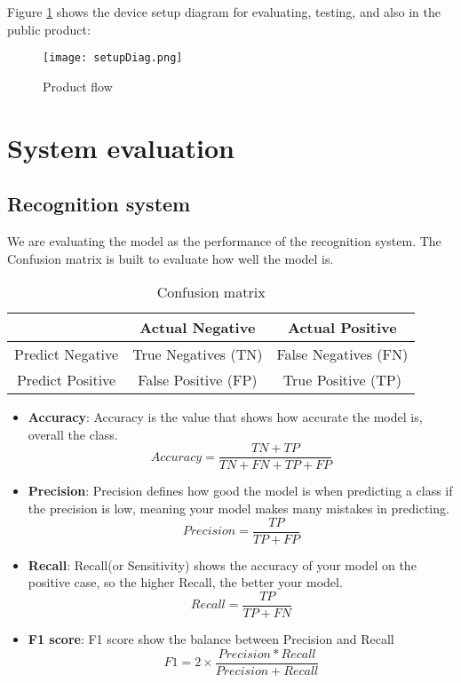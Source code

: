 Figure \ref{fig:prodSetup} shows the device setup diagram for evaluating, testing, and also in the public product:

\begin{figure}[H]
    \centering
    \texttt{[image: setupDiag.png]}
    \caption{Product flow}
    \label{fig:prodSetup}
\end{figure}

\section{System evaluation}
\subsection{Recognition system}
We are evaluating the model as the performance of the recognition system. The Confusion matrix is built to evaluate how well the model is.

\begin{table}[H]
    \centering
    \caption{Confusion matrix}
    \begin{tabular}{|c|c|c|}
        \hline
         &  Actual Negative &  Actual Positive\\
        \hline
        Predict Negative & True Negatives (TN) & False Negatives (FN)\\
        \hline
        Predict Positive & False Positive (FP) & True Positive (TP)\\
        \hline
    \end{tabular}
    \label{tab:confusionMatrix}
\end{table}
\begin{itemize}
    \item \textbf{Accuracy}: Accuracy is the value that shows how accurate  the model is, overall the class.
    \[
        Accuracy = \frac{TN+TP}{TN+FN+TP+FP}
    \]
    \item \textbf{Precision}: Precision defines how good the model is when predicting a class if the precision is low, meaning your model makes many mistakes in predicting.
    \[
        Precision = \frac{TP}{TP+FP}
    \]
    \item \textbf{Recall}: Recall(or Sensitivity) shows the accuracy of your model on the positive case, so the higher Recall, the better your model.
    \[
        Recall = \frac{TP}{TP+FN}
    \]
    \item \textbf{F1 score}: F1 score show the balance between Precision and Recall
    \[
        F1 = 2\times\frac{Precision*Recall}{Precision+Recall}
    \]
\end{itemize}

